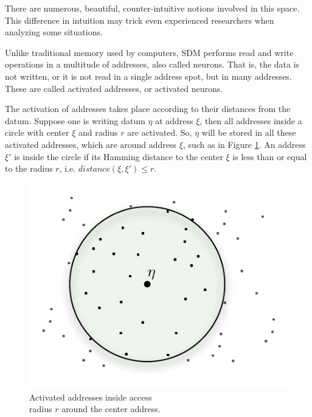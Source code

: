 There are numerous, beautiful, counter-intuitive notions involved in this space. This difference in intuition may trick even experienced researchers when analyzing some situations.



















Unlike traditional memory used by computers, SDM performs read and write operations in a multitude of addresses, also called neurons.  That is, the data is not written, or it is not read in a single address spot, but in many addresses. These are called activated addresses, or activated neurons.

The activation of addresses takes place according to their distances from the datum. Suppose one is writing datum $\eta$ at address $\xi$, then all addresses inside a circle with center $\xi$ and radius $r$ are activated. So, $\eta$ will be stored in all these activated addresses, which are around address $\xi$, such as in Figure \ref{fig-addresses-inside-access-radius}.  An address $\xi'$ is inside the circle if its Hamming distance to the center $\xi$ is less than or equal to the radius $r$, i.e. $distance(\xi,\xi')\leq r$.

\begin{figure}[!htb]
\centering\includegraphics[scale=0.75]{./images02/p_circle_r.pdf}

\caption{Activated addresses inside access \protect \\
radius $r$ around the center address.\label{fig-addresses-inside-access-radius}}
\end{figure}




